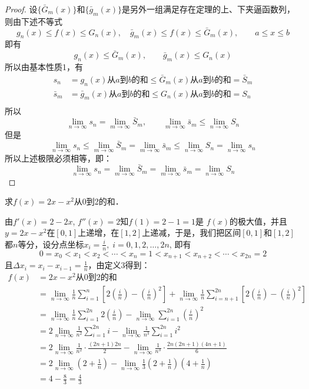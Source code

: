 \begin{proof}
    设$\{\bar G_m(x)\}$和$\{\bar g_m(x)\}$是另外一组满足存在定理的上、下夹逼函数列，则由下述不等式
\[g_n(x)\le f(x)\le G_n(x),\quad \bar g_m(x)\le f(x)\le \bar G_m(x),\qquad a\le x\le b\]
即有
\[g_n(x)\le \bar G_m(x),\qquad \bar g_m(x)\le G_n(x)\]
所以由基本性质1，有
\begin{align*}
    s_n&=g_n(x)\text{从$a$到$b$的和}\le \bar G_m(x)\text{从$a$到$b$的和}=\bar S_m\\
    \bar s_m&=\bar g_m(x)\text{从$a$到$b$的和}\le G_n(x)\text{从$a$到$b$的和}=S_n\\
\end{align*}
所以
\[\lim_{n\to\infty}s_n=\lim_{m\to\infty}\bar S_m,\qquad \lim_{m\to\infty}\bar s_m\le \lim_{n\to\infty}S_n\]
但是
\[\lim_{n\to\infty}s_n\le \lim_{m\to\infty}\bar S_m=\lim_{m\to\infty}\bar s_m\le \lim_{n\to\infty} S_n=\lim_{n\to\infty}s_n\]
所以上述极限必须相等，即：
\[\lim_{n\to\infty}s_n= \lim_{m\to\infty}\bar S_m=\lim_{m\to\infty}\bar s_m=\lim_{n\to\infty} S_n\]
\end{proof}

\begin{example}
求$f(x)=2x-x^2$从0到2的和．
\end{example}

\begin{solution}
    由$f'(x)=2-2x$, $f''(x)=2$知$f(1)=2-1=1$是
$f(x)$的极大值，并且$y=2x-x^2$在$[0, 1]$上递增，在$[1,2]$上递减，于是，我们把区间$[0, 1]$和$[1, 2]$都$n$等分，设分点坐标$x_i=\frac{i}{n},\; i=0, 1, 2,\ldots,2n$, 即有
\[0=x_0<x_1<x_2<\cdots <x_n=1<x_{n+1}<x_{n+2}<\cdots <x_{2n}=2\]
且$\Delta x_i=x_i-x_{i-1}=\frac{1}{n}$，由定义3得到：
\begin{align*}
    f(x)&=2x-x^2\text{从0到2的和}\\
    &=\lim_{n\to\infty}\frac{1}{n}\sum^n_{i=1}\left[2\left(\frac{i}{n}\right)-\left(\frac{i}{n}\right)^2\right]+\lim_{n\to\infty}\frac{1}{n}\sum^{2n}_{i=n+1}\left[2\left(\frac{i}{n}\right)-\left(\frac{i}{n}\right)^2\right] \\
&=\lim_{n\to\infty}\frac{1}{n}\sum^{2n}_{i=1}2\left(\frac{i}{n}\right)-\lim_{n\to\infty}\sum^{2n}_{i=1}\left(\frac{i}{n}\right)^2\\
&=2\lim_{n\to\infty}\frac{1}{n^2}\sum^{2n}_{i=1}i-\lim_{n\to\infty}\frac{1}{n^3}\sum^{2n}_{i=1}i^2\\
&=2\lim_{n\to\infty}\frac{1}{n^2}\cdot \frac{(2n+1)2n}{2}-\lim_{n\to\infty}\frac{1}{n^3}\cdot \frac{2n(2n+1)(4n+1)}{6}\\
&=2\lim_{n\to\infty}\left(2+\frac{1}{n}\right)-\lim_{n\to\infty}\frac{1}{3}\left(2+\frac{1}{n}\right)\left(4+\frac{1}{n}\right)\\
&=4-\frac{8}{3}=\frac{4}{3}
\end{align*}
\end{solution}

